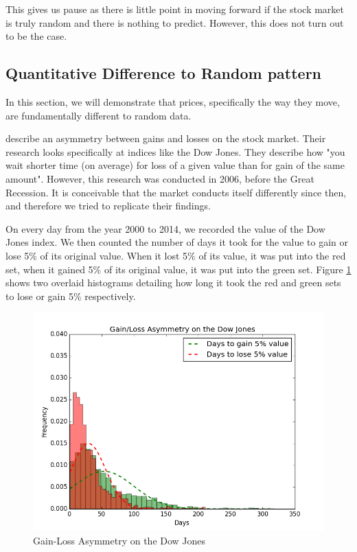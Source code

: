 \documentclass{report}
\begin{document}
This gives us pause as there is little point in moving forward if the stock market is truly random and there is nothing to predict. However, this does not turn out to be the case. 

\subsection{Quantitative Difference to Random pattern}

In this section, we will demonstrate that prices, specifically the way they move, are fundamentally different to random data.

\citet{karpio2007gain} describe an asymmetry between gains and losses on the stock market. Their research looks specifically at indices like the Dow Jones. They describe how "you wait shorter time (on average) for loss of a given value than for gain of the same amount". However, this research was conducted in 2006, before the Great Recession. It is conceivable that the market conducts itself differently since then, and therefore we tried to replicate their findings.

On every day from the year 2000 to 2014, we recorded the value of the Dow Jones index. We then counted the number of days it took for the value to gain or lose 5\% of its original value. When it lost 5\% of its value, it was put into the red set, when it gained 5\% of its original value, it was put into the green set. Figure \ref{fig:gain-loss-asymm} shows two overlaid histograms detailing how long it took the red and green sets to lose or gain 5\% respectively.

\begin{figure}[H]
	\caption{Gain-Loss Asymmetry on the Dow Jones}
	\centerline{\includegraphics[width=\textwidth]{vis/gain_loss_asymmetry.png}}
	\label{fig:gain-loss-asymm}
\end{figure}
\end{document}
